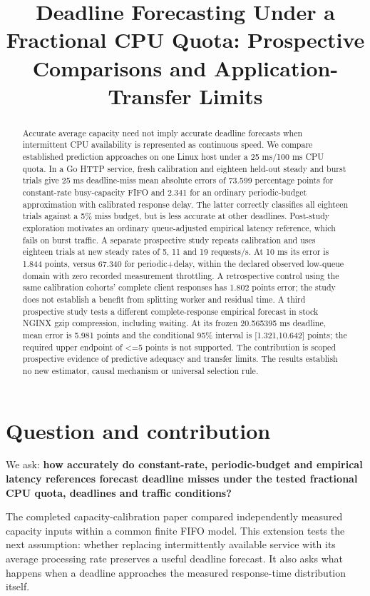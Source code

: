\documentclass[11pt,a4paper]{article}
\title{Deadline Forecasting Under a Fractional CPU Quota: Prospective Comparisons and Application-Transfer Limits}
\author{}
\date{}
\begin{document}
\maketitle
\begin{abstract}

Accurate average capacity need not imply accurate deadline forecasts when
intermittent CPU availability is represented as continuous speed. We compare
established prediction approaches on one Linux host under a 25 ms/100 ms CPU
quota. In a Go HTTP service, fresh calibration and eighteen held-out steady
and burst trials give 25 ms deadline-miss mean absolute errors of 73.599
percentage points for constant-rate busy-capacity FIFO and 2.341 for an
ordinary periodic-budget approximation with calibrated response delay.
The latter correctly classifies all eighteen trials against a 5\% miss budget,
but is less accurate at other deadlines. Post-study exploration motivates an
ordinary queue-adjusted empirical latency reference, which fails on burst traffic.
A separate prospective study repeats calibration and uses eighteen trials at
new steady rates of 5, 11 and 19 requests/s. At 10 ms its error is 1.844 points,
versus 67.340 for periodic+delay, within the declared observed low-queue domain
with zero recorded measurement throttling. A retrospective control using the
same calibration cohorts' complete client responses has 1.802 points error;
the study does not establish a benefit from splitting worker and residual time.
A third prospective study tests a
different complete-response empirical forecast in stock NGINX gzip compression,
including waiting. At its frozen 20.565395 ms deadline, mean error is 5.981
points and the conditional 95\% interval is [1.321,10.642] points; the required
upper endpoint of <=5 points is not supported. The contribution is scoped
prospective evidence of predictive adequacy and transfer limits. The results
establish no new estimator, causal mechanism or universal selection rule.

\end{abstract}
\section{Question and contribution}

We ask: \textbf{how accurately do constant-rate, periodic-budget and empirical latency references forecast deadline misses under the tested fractional CPU quota, deadlines and traffic conditions?}

The completed capacity-calibration paper \cite{capacityprecursor} compared independently measured
capacity inputs within a common finite FIFO model. This extension tests the
next assumption: whether replacing intermittently available service with its
average processing rate preserves a useful deadline forecast. It also asks
what happens when a deadline approaches the measured response-time
distribution itself.
\end{document}
